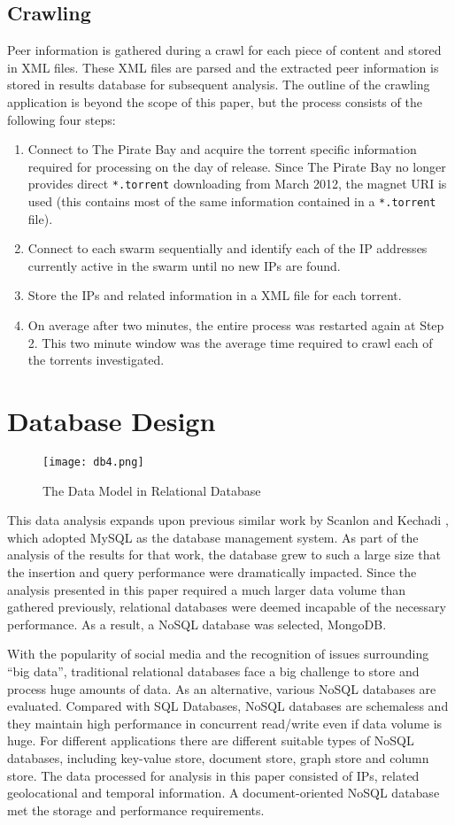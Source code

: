 \documentclass[conference]{IEEEtran}
\begin{document}
\subsection{Crawling}
Peer information is gathered during a crawl for each piece of content and stored in XML files. These XML files are parsed and the extracted peer information is stored in results database for subsequent analysis. The outline of the crawling application is beyond the scope of this paper, but the process consists of the following four steps:
\begin{enumerate}
\item Connect to The Pirate Bay and acquire the torrent specific information required for processing on the day of release. Since The Pirate Bay no longer provides direct \texttt{*.torrent} downloading from March 2012, the magnet URI is used (this contains most of the same information contained in a \texttt{*.torrent} file).
\item Connect to each swarm sequentially and identify each of the IP addresses currently active in the swarm until
no new IPs are found.
\item Store the IPs and related information in a XML file for each torrent.
\item On average after two minutes, the entire process was restarted again at Step 2. This two minute window was the average time required to crawl each of the torrents investigated.
\end{enumerate}


\section{Database Design}
\begin{figure}[!b]
\centering
\texttt{[image: db4.png]}
\caption{The Data Model in Relational Database}
\label{DB}
\end{figure}
This data analysis expands upon previous similar work by Scanlon and Kechadi \cite{scanlon}, which adopted MySQL as the database management system. As part of the analysis of the results for that work, the database grew to such a large size that the insertion and query performance were dramatically impacted. Since the analysis presented in this paper required a much larger data volume than gathered previously, relational databases were deemed incapable of the necessary performance. As a result, a NoSQL database was selected, MongoDB.

With the popularity of social media and the recognition of issues surrounding ``big data'', traditional relational databases face a big challenge to store and process huge amounts of data. As an alternative, various NoSQL databases are evaluated. Compared with SQL Databases, NoSQL databases are schemaless and they maintain high performance in concurrent read/write even if data volume is huge. For different applications there are different suitable types of NoSQL databases, including key-value store, document store, graph store and column store. The data processed for analysis in this paper consisted of IPs, related geolocational and temporal information. A document-oriented NoSQL database met the storage and performance requirements.
\end{document}
